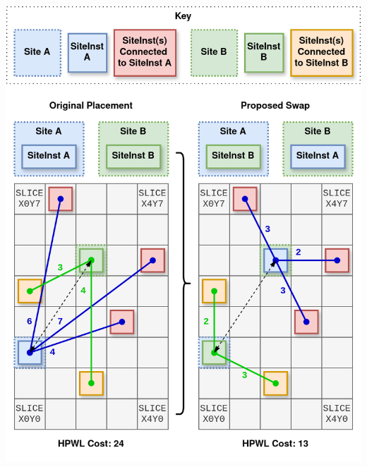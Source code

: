 {
    \centering
    \includegraphics[width=\columnwidth]{figures/placement/swapSingleSite.png}
    \label{fig:swapSingleSite}
}

